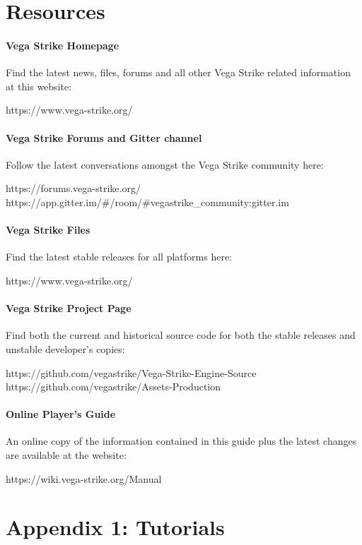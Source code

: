 \documentclass{article}
\begin{document}
\section{ Resources }

\paragraph{Vega Strike Homepage }

Find the latest news, files, forums and all other Vega Strike related information at this website: 

https://www.vega-strike.org/

\paragraph{Vega Strike Forums and Gitter channel }

Follow the latest conversations amongst the Vega Strike community here: 

https://forums.vega-strike.org/
https://app.gitter.im/\#/room/\#vegastrike\_community:gitter.im

\paragraph{Vega Strike Files }

Find the latest stable releases for all platforms here: 

https://www.vega-strike.org/

\paragraph{Vega Strike Project Page }

Find both the current and historical source code for both the stable releases and unstable developer's copies: 

https://github.com/vegastrike/Vega-Strike-Engine-Source
https://github.com/vegastrike/Assets-Production

\paragraph{Online Player's Guide }

An online copy of the information contained in this guide plus the latest changes are available at the website: 

https://wiki.vega-strike.org/Manual

\section{ Appendix 1: Tutorials }
\end{document}
